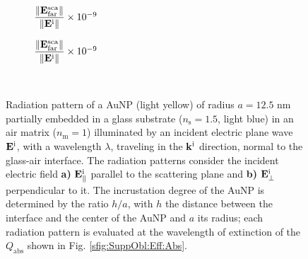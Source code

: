 \begin{figure}[h!]
    \centering
    \def\svgwidth{.8\textwidth}
    \\
        \vspace*{-16.5em}%
        \hspace*{-.2\textwidth}%
    \begin{subfigure}{.4\textwidth}\caption{\footnotesize$\dfrac{\norm{\vb{E}^\text{sca}_\text{far}}}{\norm{\vb{E}^\text{i}}} \times 10^{-9}$  }\label{sfig:Far:IncNorm:a}\end{subfigure}%
    \begin{subfigure}{.4\textwidth}\caption{\footnotesize$\dfrac{\norm{\vb{E}^\text{sca}_\text{far}}}{\norm{\vb{E}^\text{i}}} \times 10^{-9}$  }\label{sfig:Far:IncNorm:b}\end{subfigure}\\[14em]
    \caption[  Radiation pattern of a AuNP supported on a substrate illuminated at oblique incidence ]{Radiation pattern of a AuNP (light yellow) of radius $a = 12.5$ nm partially embedded in a glass substrate ($n_\text{s} = 1.5$, light blue) in an air matrix ($n_\text{m} = 1$) illuminated by an incident electric plane wave $\vb{E}^\text{i}$, with a wavelength $\lambda$, traveling in the $\vb{k}^\text{i}$ direction, normal to the glass-air interface. The radiation patterns consider the incident electric field \textbf{a)} $\vb{E}^\text{i}_\parallel$ parallel to the scattering plane  and \textbf{b)} $\vb{E}^\text{i}_\perp$ perpendicular to it. The incrustation degree of the AuNP is determined by the ratio $h/a$, with $h$ the distance between the interface and the center of the AuNP and $a$ its radius; each  radiation pattern is evaluated at the wavelength of extinction of the $Q_\text{abs}$ shown in Fig. \ref{sfig:SuppObl:Eff:Abs}.}
    \label{fig:Far:IncNorm}
\end{figure}





